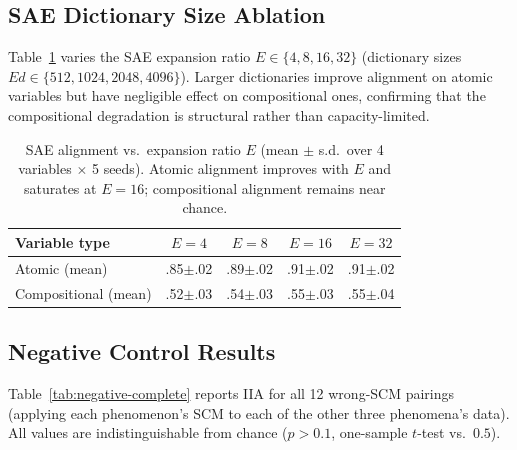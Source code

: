 \documentclass[11pt]{article}
\newcommand{\spm}[1]{{\scriptsize$\pm$#1}}
\begin{document}
\subsection{SAE Dictionary Size Ablation}
\label{app:sae-size}

Table~\ref{tab:sae-size} varies the SAE expansion ratio $E \in \{4, 8, 16, 32\}$ (dictionary sizes $Ed \in \{512, 1024, 2048, 4096\}$).
Larger dictionaries improve alignment on atomic variables but have negligible effect on compositional ones, confirming that the compositional degradation is structural rather than capacity-limited.

\begin{table}[t]
\centering\footnotesize
\setlength{\tabcolsep}{3pt}
\begin{tabular}{@{}lcccc@{}}
\toprule
\textbf{Variable type} & $E{=}4$ & $E{=}8$ & $E{=}16$ & $E{=}32$ \\
\midrule
Atomic (mean)        & .85\spm{.02} & .89\spm{.02} & .91\spm{.02} & .91\spm{.02} \\
Compositional (mean) & .52\spm{.03} & .54\spm{.03} & .55\spm{.03} & .55\spm{.04} \\
\bottomrule
\end{tabular}
\caption{SAE alignment vs.\ expansion ratio $E$ (mean $\pm$ s.d.\ over 4 variables $\times$ 5 seeds). Atomic alignment improves with $E$ and saturates at $E{=}16$; compositional alignment remains near chance.}
\label{tab:sae-size}
\end{table}

\subsection{Negative Control Results}
\label{app:negative}

Table~\ref{tab:negative-complete} reports IIA for all 12 wrong-SCM pairings (applying each phenomenon's SCM to each of the other three phenomena's data).
All values are indistinguishable from chance ($p > 0.1$, one-sample $t$-test vs.\ $0.5$).
\end{document}
